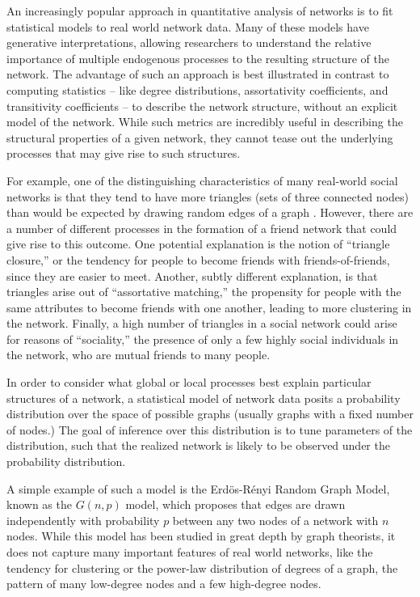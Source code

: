 
An increasingly popular approach in quantitative analysis of networks is to fit statistical models to real world network data. Many of these models have generative interpretations, allowing researchers to understand the relative importance of multiple endogenous processes to the resulting structure of the network. The advantage of such an approach is best illustrated in contrast to computing statistics -- like degree distributions, assortativity coefficients, and transitivity coefficients -- to describe the network structure, without an explicit model of the network. While such metrics are incredibly useful in describing the structural properties of a given network, they cannot tease out the underlying processes that may give rise to such structures. 

For example, one of the distinguishing characteristics of many real-world social networks is that they tend to have more triangles (sets of three connected nodes) than would be expected by drawing random edges of a graph \cite{GKM09}. However, there are a number of different processes in the formation of a friend network that could give rise to this outcome. One potential explanation is the notion of ``triangle closure,'' or the tendency for people to become friends with friends-of-friends, since they are easier to meet. Another, subtly different explanation, is that triangles arise out of ``assortative matching,'' the propensity for people with the same attributes to become friends with one another, leading to more clustering in the network. Finally, a high number of triangles in a social network could arise for reasons of ``sociality,''  the presence of only a few highly social individuals in the network, who are mutual friends to many people.

In order to consider what global or local processes best explain particular structures of a network, a statistical model of network data posits a probability distribution over the space of possible graphs (usually graphs with a fixed number of nodes.) The goal of inference over this distribution is to tune parameters of the distribution, such that the realized network is likely to be observed under the probability distribution. 

A simple example of such a model is the Erd\"{o}s-R\'{e}nyi Random Graph Model, known as the $G(n,p)$ model, which proposes that edges are drawn independently with probability $p$ between any two nodes of a network with $n$ nodes. While this model has been studied in great depth by graph theorists, it does not capture many important features of real world networks, like the tendency for clustering or the power-law distribution of degrees of a graph, the pattern of many low-degree nodes and a few high-degree nodes.   

